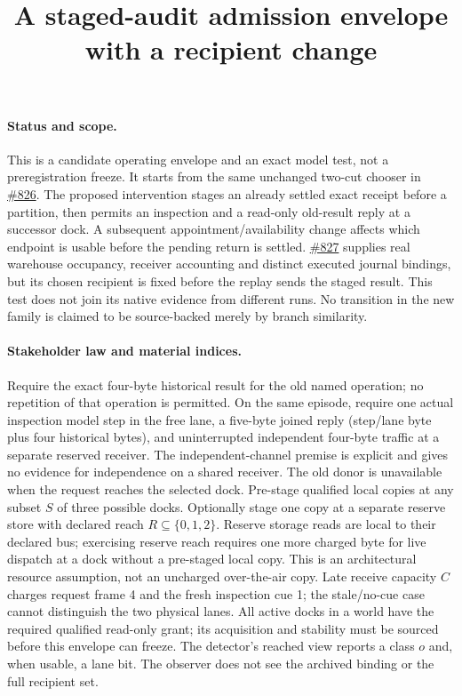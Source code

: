 \documentclass{article}
\title{A staged-audit admission envelope with a recipient change}
\begin{document}
\maketitle

\paragraph{Status and scope.}
This is a candidate operating envelope and an exact model test, not a preregistration freeze. It starts from the same unchanged two-cut chooser in \href{https://github.com/eternal-november/eos-research-programmes/pull/826}{\#826}. The proposed intervention stages an already settled exact receipt before a partition, then permits an inspection and a read-only old-result reply at a successor dock. A subsequent appointment/availability change affects which endpoint is usable before the pending return is settled. \href{https://github.com/eternal-november/eos-research-programmes/pull/827}{\#827} supplies real warehouse occupancy, receiver accounting and distinct executed journal bindings, but its chosen recipient is fixed before the replay sends the staged result. This test does not join its native evidence from different runs. No transition in the new family is claimed to be source-backed merely by branch similarity.

\paragraph{Stakeholder law and material indices.}
Require the exact four-byte historical result for the old named operation; no repetition of that operation is permitted. On the same episode, require one actual inspection model step in the free lane, a five-byte joined reply (step/lane byte plus four historical bytes), and uninterrupted independent four-byte traffic at a separate reserved receiver. The independent-channel premise is explicit and gives no evidence for independence on a shared receiver. The old donor is unavailable when the request reaches the selected dock. Pre-stage qualified local copies at any subset \(S\) of three possible docks. Optionally stage one copy at a separate reserve store with declared reach \(R\subseteq\{0,1,2\}\). Reserve storage reads are local to their declared bus; exercising reserve reach requires one more charged byte for live dispatch at a dock without a pre-staged local copy. This is an architectural resource assumption, not an uncharged over-the-air copy. Late receive capacity \(C\) charges request frame 4 and the fresh inspection cue 1; the stale/no-cue case cannot distinguish the two physical lanes. All active docks in a world have the required qualified read-only grant; its acquisition and stability must be sourced before this envelope can freeze. The detector's reached view reports a class \(o\) and, when usable, a lane bit. The observer does not see the archived binding or the full recipient set.
\end{document}
